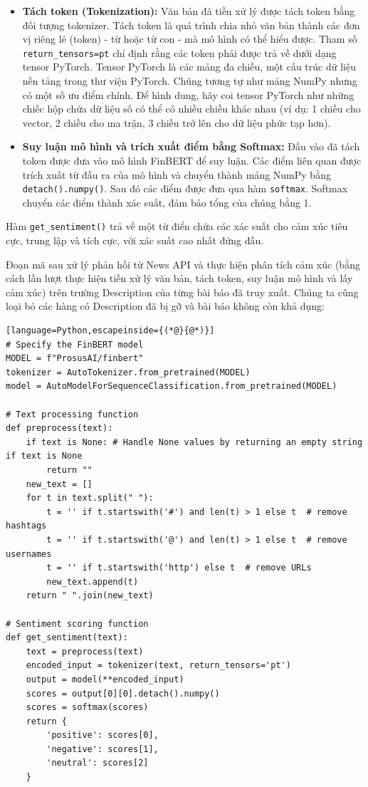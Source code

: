 \begin{itemize}
\item
  \textbf{Tách token (Tokenization):} Văn bản đã tiền xử lý được tách token bằng đối tượng tokenizer. Tách token là quá trình chia nhỏ văn bản thành các đơn vị riêng lẻ (token) - từ hoặc từ con - mà mô hình có thể hiểu được. Tham số \texttt{return\_tensors=\textquotesingle{}pt\textquotesingle{}} chỉ định rằng các token phải được trả về dưới dạng tensor PyTorch. Tensor PyTorch là các mảng đa chiều, một cấu trúc dữ liệu nền tảng trong thư viện PyTorch. Chúng tương tự như mảng NumPy nhưng có một số ưu điểm chính. Để hình dung, hãy coi tensor PyTorch như những chiếc hộp chứa dữ liệu số có thể có nhiều chiều khác nhau (ví dụ: 1 chiều cho vector, 2 chiều cho ma trận, 3 chiều trở lên cho dữ liệu phức tạp hơn).
\item
  \textbf{Suy luận mô hình và trích xuất điểm bằng Softmax:} Đầu vào đã tách token được đưa vào mô hình FinBERT để suy luận. Các điểm liên quan được trích xuất từ đầu ra của mô hình và chuyển thành mảng NumPy bằng \texttt{detach().numpy()}. Sau đó các điểm được đưa qua hàm \texttt{softmax}. Softmax chuyển các điểm thành xác suất, đảm bảo tổng của chúng bằng 1.
\end{itemize}

Hàm \texttt{get\_sentiment()} trả về một từ điển chứa các xác suất cho cảm xúc tiêu cực, trung lập và tích cực, với xác suất cao nhất đứng đầu.

Đoạn mã sau xử lý phản hồi từ News API và thực hiện phân tích cảm xúc (bằng cách lần lượt thực hiện tiền xử lý văn bản, tách token, suy luận mô hình và lấy cảm xúc) trên trường \textquotesingle Description\textquotesingle{} của từng bài báo đã truy xuất. Chúng ta cũng loại bỏ các hàng có \textquotesingle Description\textquotesingle{} đã bị gỡ và bài báo không còn khả dụng:

\begin{lstlisting}[language=Python,escapeinside={(*@}{@*)}]
# Specify the FinBERT model
MODEL = f"ProsusAI/finbert"
tokenizer = AutoTokenizer.from_pretrained(MODEL)
model = AutoModelForSequenceClassification.from_pretrained(MODEL)

# Text processing function
def preprocess(text):
    if text is None: # Handle None values by returning an empty string if text is None
        return ""
    new_text = []
    for t in text.split(" "):
        t = '' if t.startswith('#') and len(t) > 1 else t  # remove hashtags
        t = '' if t.startswith('@') and len(t) > 1 else t  # remove usernames
        t = '' if t.startswith('http') else t  # remove URLs
        new_text.append(t)
    return " ".join(new_text)

# Sentiment scoring function
def get_sentiment(text):
    text = preprocess(text)
    encoded_input = tokenizer(text, return_tensors='pt')
    output = model(**encoded_input)
    scores = output[0][0].detach().numpy()
    scores = softmax(scores)
    return {
        'positive': scores[0],
        'negative': scores[1],
        'neutral': scores[2]
    }
\end{lstlisting}

